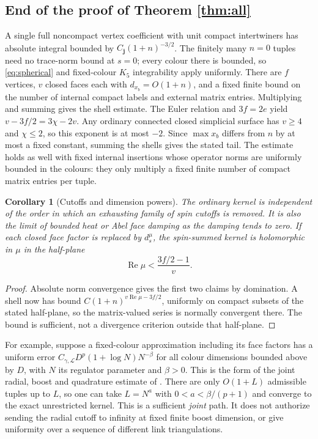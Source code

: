 \documentclass[11pt]{article}
\newtheorem{corollary}[theorem]{Corollary}
\theoremstyle{remark}
\begin{document}
\subsection{End of the proof of Theorem \ref{thm:all}}
A single full noncompact vertex coefficient with unit compact intertwiners has absolute integral bounded by \(C_{\boldsymbol j}(1+n)^{-3/2}\). The finitely many \(n=0\) tuples need no trace-norm bound at \(s=0\); every colour there is bounded, so \eqref{eq:spherical} and fixed-colour \(K_5\) integrability \cite{Kaminski} apply uniformly. There are \(f\) vertices, \(v\) closed faces each with \(d_{x_b}=O(1+n)\), and a fixed finite bound on the number of internal compact labels and external matrix entries. Multiplying and summing gives the shell estimate. The Euler relation and \(3f=2e\) yield \(v-3f/2=3\chi-2v\). Any ordinary connected closed simplicial surface has \(v\ge4\) and \(\chi\le2\), so this exponent is at most \(-2\). Since \(\max x_b\) differs from \(n\) by at most a fixed constant, summing the shells gives the stated tail. The estimate holds as well with fixed internal insertions whose operator norms are uniformly bounded in the colours: they only multiply a fixed finite number of compact matrix entries per tuple.

\begin{corollary}[Cutoffs and dimension powers]\label{cor:cutoff}
The ordinary kernel is independent of the order in which an exhausting family of spin cutoffs is removed. It is also the limit of bounded heat or Abel face damping as the damping tends to zero. If each closed face factor is replaced by \(d_s^\mu\), the spin-summed kernel is holomorphic in \(\mu\) in the half-plane
\[
 \operatorname{Re}\mu<\frac{3f/2-1}{v}.
\]
\end{corollary}
\begin{proof}
Absolute norm convergence gives the first two claims by domination. A shell now has bound \(C(1+n)^{v\operatorname{Re}\mu-3f/2}\), uniformly on compact subsets of the stated half-plane, so the matrix-valued series is normally convergent there. The bound is sufficient, not a divergence criterion outside that half-plane.
\end{proof}

For example, suppose a fixed-colour approximation including its face factors has a uniform error \(C_{\gamma,\mathcal L}D^p(1+\log N)N^{-\beta}\) for all colour dimensions bounded above by \(D\), with \(N\) its regulator parameter and \(\beta>0\). This is the form of the joint radial, boost and quadrature estimate of \cite{Archive69}. There are only \(O(1+L)\) admissible tuples up to \(L\), so one can take \(L=N^a\) with \(0<a<\beta/(p+1)\) and converge to the exact unrestricted kernel. This is a sufficient \emph{joint} path. It does not authorize sending the radial cutoff to infinity at fixed finite boost dimension, or give uniformity over a sequence of different link triangulations.
\end{document}
